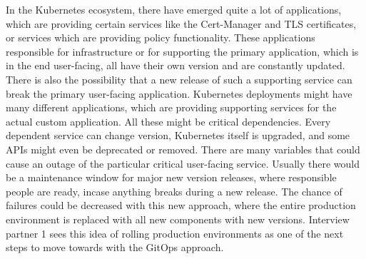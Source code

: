 In the Kubernetes ecosystem, there have emerged quite a lot of applications,
which are providing certain services like the Cert-Manager and TLS certificates,
or services which are providing policy functionality.
These applications responsible for infrastructure or for supporting the primary application,
which is in the end user-facing,
all have their own version and are constantly updated.
There is also the possibility that a new release of such a supporting service
can break the primary user-facing application.
Kubernetes deployments might have many different applications,
which are providing supporting services for the actual custom application.
All these might be critical dependencies. Every dependent service can change version,
Kubernetes itself is upgraded, and some APIs might even be deprecated or removed.
There are many variables that could cause an outage of the particular critical user-facing service.
Usually there would be a maintenance window for major new version releases,
where responsible people are ready, incase anything breaks during a new release.
The chance of failures could be decreased with this new approach,
where the entire production environment is replaced with all new components with new versions.
Interview partner 1 sees this idea of rolling production environments as one of the next steps to move towards with the GitOps approach.


